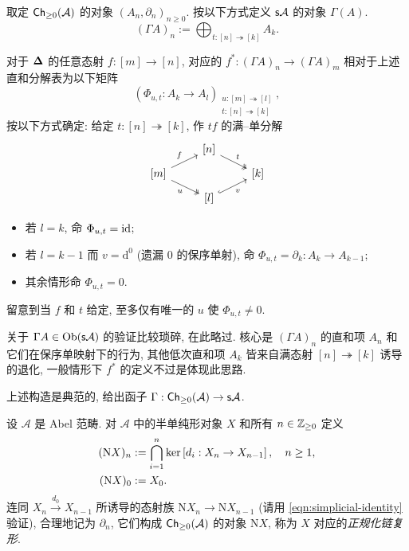 \begin{definition}\label{def:DK-Gamma}
	取定 $\mathsf{Ch}_{\geq 0}(\mathcal{A})$ 的对象 $(A_n, \partial_n)_{n \geq 0}$. 按以下方式定义 $\mathsf{s}\mathcal{A}$ 的对象 $\Gamma(A)$.
	\[ (\Gamma A)_n := \bigoplus_{t: [n] \twoheadrightarrow [k]} A_k. \]
	
	对于 $\bm\Delta$ 的任意态射 $f: [m] \to [n]$, 对应的 $f^*: (\Gamma A)_n \to (\Gamma A)_m$ 相对于上述直和分解表为以下矩阵 
	\[ \left( \Phi_{u, t} : A_k \to A_l \right)_{\substack{ u: [m] \twoheadrightarrow [l] \\ t: [n] \twoheadrightarrow [k] }}, \]
	按以下方式确定: 给定 $t: [n] \twoheadrightarrow [k]$, 作 $tf$ 的满--单分解
	\begin{equation}\label{eqn:Dold-Kan-epi-mono}\begin{tikzcd}[row sep=tiny]
		& {[n]} \arrow[twoheadrightarrow, rd, "t"] & \\
		{[m]} \arrow[ru, "f"] \arrow[twoheadrightarrow, rd, "u"'] & & {[k]} \\
		& {[l]} \arrow[hookrightarrow, ru, "v"'] &
	\end{tikzcd}\end{equation}
	\begin{itemize}
		\item 若 $l = k$, 命 $\Phi_{u, t} = \mathrm{id}$;
		\item 若 $l = k-1$ 而 $v = \mathrm{d}^0$ (遗漏 $0$ 的保序单射), 命 $\Phi_{u, t} = \partial_k: A_k \to A_{k-1}$;
		\item 其余情形命 $\Phi_{u, t} = 0$.
	\end{itemize}
	留意到当 $f$ 和 $t$ 给定, 至多仅有唯一的 $u$ 使 $\Phi_{u, t} \neq 0$.
\end{definition}

关于 $\Gamma A \in \operatorname{Ob}(\mathsf{s}\mathcal{A})$ 的验证比较琐碎, 在此略过. 核心是 $(\Gamma A)_n$ 的直和项 $A_n$ 和它们在保序单映射下的行为, 其他低次直和项 $A_k$ 皆来自满态射 $[n] \twoheadrightarrow [k]$ 诱导的退化, 一般情形下 $f^*$ 的定义不过是体现此思路.

上述构造是典范的, 给出函子 $\Gamma: \mathsf{Ch}_{\geq 0}(\mathcal{A}) \to \mathsf{s}\mathcal{A}$.

\begin{definition}\label{def:normalized-cplx}
	设 $\mathcal{A}$ 是 Abel 范畴. 对 $\mathcal{A}$ 中的半单纯形对象 $X$ 和所有 $n \in \mathbb{Z}_{\geq 0}$ 定义
	\begin{align*}
		(\mathrm{N} X)_n & := \bigcap_{i=1}^n \operatorname{ker}\left[ d_i: X_n \to X_{n-1} \right], \quad n \geq 1, \\
		(\mathrm{N} X)_0 & := X_0.
	\end{align*}
	连同 $X_n \xrightarrow{d_0} X_{n-1}$ 所诱导的态射族 $\mathrm{N}X_n \to \mathrm{N}X_{n-1}$ (请用 \eqref{eqn:simplicial-identity} 验证), 合理地记为 $\partial_n$, 它们构成 $\mathsf{Ch}_{\geq 0}(\mathcal{A})$ 的对象 $\mathrm{N}X$, 称为 $X$ 对应的\emph{正规化链复形}.
\end{definition}

